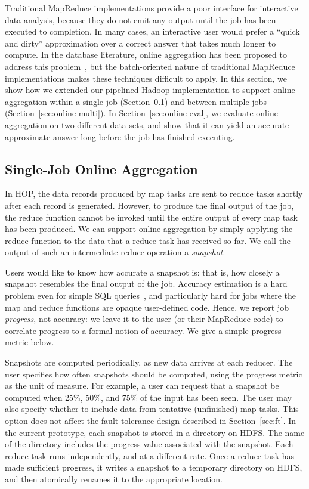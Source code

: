 Traditional MapReduce implementations provide a poor interface for interactive
data analysis, because they do not emit any output until the job has been
executed to completion. In many cases, an interactive user would prefer a
``quick and dirty'' approximation over a correct answer that takes much longer
to compute. In the database literature, online aggregation has been proposed to
address this problem~\cite{onlineagg}, but the batch-oriented nature of
traditional MapReduce implementations makes these techniques difficult to
apply. In this section, we show how we extended our pipelined Hadoop
implementation to support online aggregation within a single job
(Section~\ref{sec:online-single}) and between multiple jobs
(Section~\ref{sec:online-multi}). In Section~\ref{sec:online-eval}, we evaluate
online aggregation on two different data sets, and show that it can yield an
accurate approximate answer long before the job has finished executing.

\subsection{Single-Job Online Aggregation}
\label{sec:online-single}

In HOP, the data records produced by map tasks are sent to reduce tasks shortly
after each record is generated. However, to produce the final output of the job,
the reduce function cannot be invoked until the entire output of every map task
has been produced. We can support online aggregation by simply applying the
reduce function to the data that a reduce task has received so far. We call the
output of such an intermediate reduce operation a \emph{snapshot}.

Users would like to know how accurate a snapshot is: that is, how
closely a snapshot resembles the final output of the job. Accuracy
estimation is a hard problem even for simple SQL queries~\cite{dbo}, 
and particularly hard for jobs where the map and reduce
functions are opaque user-defined code. Hence, we report job \emph{progress}, not
accuracy: we leave it to the user (or their MapReduce code) to correlate
progress to a formal notion of accuracy.  We give a simple progress metric below.

Snapshots are computed periodically, as new data arrives at each reducer. The
user specifies how often snapshots should be computed, using the progress metric
as the unit of measure. For example, a user can request that a snapshot be
computed when 25\%, 50\%, and 75\% of the input has been seen. The user may also
specify whether to include data from tentative (unfinished) map tasks. This
option does not affect the fault tolerance design described in
Section~\ref{sec:ft}. In the current prototype, each snapshot is stored in a
directory on HDFS\@. The name of the directory includes the progress value
associated with the snapshot. Each reduce task runs independently, and at a
different rate. Once a reduce task has made sufficient progress, it writes a
snapshot to a temporary directory on HDFS, and then atomically renames it to the
appropriate location.

